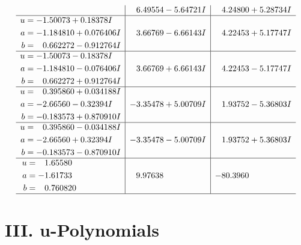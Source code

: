 \documentclass[1p]{elsarticle_modified}
\theoremstyle{definition}
\begin{document}
$$\begin{array}{c|c|c}
 & \phantom{-}6.49554 - 5.64721 I & \phantom{-}4.24800 + 5.28734 I \\ \hline\begin{aligned}
u &= -1.50073 + 0.18378 I \\
a &= -1.184810 + 0.076406 I \\
b &= \phantom{-}0.662272 - 0.912764 I\end{aligned}
 & \phantom{-}3.66769 - 6.66143 I & \phantom{-}4.22453 + 5.17747 I \\ \hline\begin{aligned}
u &= -1.50073 - 0.18378 I \\
a &= -1.184810 - 0.076406 I \\
b &= \phantom{-}0.662272 + 0.912764 I\end{aligned}
 & \phantom{-}3.66769 + 6.66143 I & \phantom{-}4.22453 - 5.17747 I \\ \hline\begin{aligned}
u &= \phantom{-}0.395860 + 0.034188 I \\
a &= -2.66560 - 0.32394 I \\
b &= -0.183573 + 0.870910 I\end{aligned}
 & -3.35478 + 5.00709 I & \phantom{-}1.93752 - 5.36803 I \\ \hline\begin{aligned}
u &= \phantom{-}0.395860 - 0.034188 I \\
a &= -2.66560 + 0.32394 I \\
b &= -0.183573 - 0.870910 I\end{aligned}
 & -3.35478 - 5.00709 I & \phantom{-}1.93752 + 5.36803 I \\ \hline\begin{aligned}
u &= \phantom{-}1.65580\phantom{ +0.000000I} \\
a &= -1.61733\phantom{ +0.000000I} \\
b &= \phantom{-}0.760820\phantom{ +0.000000I}\end{aligned}
 & \phantom{-}9.97638\phantom{ +0.000000I} & -80.3960\phantom{ +0.000000I}\\
 \hline 
 \end{array}$$\newpage
\newpage\renewcommand{\arraystretch}{1}
\centering \section*{ III. u-Polynomials}
\end{document}

